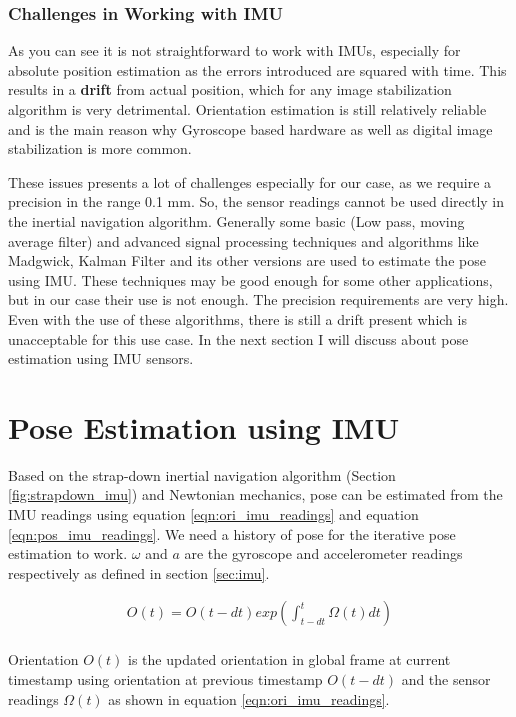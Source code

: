 \subsubsection{Challenges in Working with IMU}
As you can see it is not straightforward to work with IMUs, especially for absolute position estimation as the errors introduced are squared with time. This results in a \textbf{drift} from actual position, which for any image stabilization algorithm is very detrimental. Orientation estimation is still relatively reliable and is the main reason why Gyroscope based hardware as well as digital image stabilization is more common. 

These issues presents a lot of challenges especially for our case, as we require a precision in the range 0.1 mm. So, the sensor readings cannot be used directly in the inertial navigation algorithm. Generally some basic (Low pass, moving average filter) and advanced signal processing techniques and algorithms like Madgwick, Kalman Filter and its other versions are used to estimate the pose using IMU. These techniques may be good enough for some other applications, but in our case their use is not enough. The precision requirements are very high. Even with the use of these algorithms, there is still a drift present which is unacceptable for this use case. In the next section I will discuss about pose estimation using IMU sensors.

\section{Pose Estimation using IMU}
Based on the strap-down inertial navigation algorithm (Section \ref{fig:strapdown_imu}) and Newtonian mechanics, pose can be estimated from the IMU readings using equation \ref{eqn:ori_imu_readings} and equation \ref{eqn:pos_imu_readings}. We need a history of pose for the iterative pose estimation to work. $ \omega $ and $ a $ are the gyroscope and accelerometer readings respectively as defined in section \ref{sec:imu}.

\begin{equation}
  \label{eqn:ori_imu_readings}
  \begin{aligned}
    O(t) = O(t - dt) exp(\int_{t-dt}^{t} \Omega(t) dt) \\
  \end{aligned}
\end{equation}

 Orientation $ O(t) $ is the updated orientation in global frame at current timestamp using orientation at previous timestamp $ O(t - dt) $  and the sensor readings $ \Omega(t) $ as shown in equation \ref{eqn:ori_imu_readings}.

